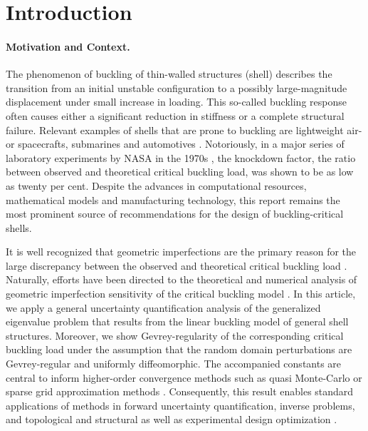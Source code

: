 \section{Introduction}
\paragraph{Motivation and Context.} 
The phenomenon of buckling of thin-walled structures (shell) describes the transition from 
an initial unstable configuration to a possibly large-magnitude
 displacement under small increase in loading. This so-called buckling response 
 often causes either a significant reduction in stiffness or a complete structural failure.
Relevant examples of shells that are prone to buckling are lightweight air- or 
spacecrafts, submarines and automotives \cite{WAGNER2020106451}. 
Notoriously, in a major series of laboratory experiments by NASA in the 1970s 
\cite{NASA_SP_8007_2020}, the knockdown factor, 
the ratio between observed and theoretical critical buckling load, was shown 
to be as low as twenty per cent. 
Despite the advances in computational resources, mathematical models and 
manufacturing technology, this report remains the most prominent source of 
recommendations for the design of buckling-critical shells. 

It is well recognized that geometric imperfections are the primary 
reason for the large discrepancy between the observed and 
theoretical critical buckling load \cite{WAGNER2020106451}. 
Naturally, efforts have been directed to the theoretical and 
numerical analysis of geometric imperfection sensitivity of the critical buckling model 
\cite{HUTCHINSON2018157,Harutyunyan2023,HILBURGER2004369, SCHENK20073424}. 
In this article, we apply a general uncertainty quantification analysis of 
the generalized eigenvalue problem that results from the linear buckling model of general shell structures. 
Moreover, we show Gevrey-regularity of the corresponding 
critical buckling load under the assumption that the random domain perturbations are 
Gevrey-regular and uniformly diffeomorphic. The accompanied 
constants are central to inform higher-order convergence methods 
such as quasi Monte-Carlo or 
sparse grid approximation methods \cite{kuo2016applicationquasimontecarlomethods,BieriDiss, Haji_Ali_2016}. 
Consequently, this result enables standard 
applications of methods in forward uncertainty quantification, 
inverse problems, and topological and structural as well as 
experimental design optimization \cite{kaarnioja2026quasimontecarlobayesiandesign,LatifiRostami2019}.


